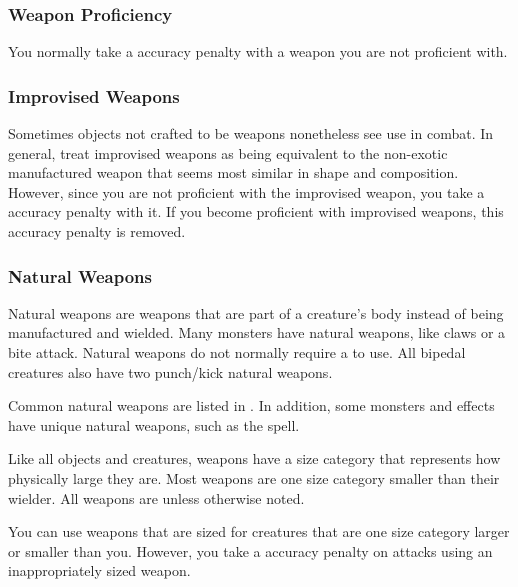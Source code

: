     \subsubsection{Weapon Proficiency}\label{Weapon Proficiency}
      You normally take a  accuracy penalty with a weapon you are not proficient with.

    \subsubsection{Improvised Weapons}\label{Improvised Weapons}
      Sometimes objects not crafted to be weapons nonetheless see use in combat.
      In general, treat improvised weapons as being equivalent to the non-exotic manufactured weapon that seems most similar in shape and composition.
      However, since you are not proficient with the improvised weapon, you take a  accuracy penalty with it.
      If you become proficient with improvised weapons, this accuracy penalty is removed.

    \subsubsection{Natural Weapons}\label{Natural Weapons}
      Natural weapons are weapons that are part of a creature's body instead of being manufactured and wielded.
      Many monsters have natural weapons, like claws or a bite attack.
      Natural weapons do not normally require a  to use.
      All bipedal creatures also have two punch/kick natural weapons.

      Common natural weapons are listed in .
      In addition, some monsters and effects have unique natural weapons, such as the  spell.

       Like all objects and creatures, weapons have a size category that represents how physically large they are. Most weapons are one size category smaller than their wielder.
      All weapons are  unless otherwise noted.

       You can use weapons that are sized for creatures that are one size category larger or smaller than you.
      However, you take a  accuracy penalty on attacks using an inappropriately sized weapon.

